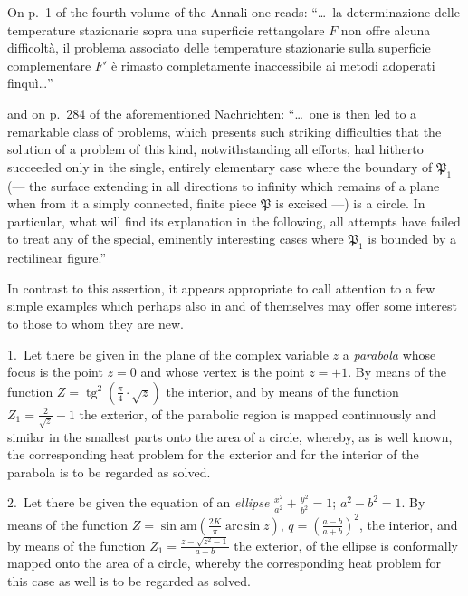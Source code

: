 \documentclass{article}
\begin{document}
On p.~1 of the fourth volume of the Annali one reads: ``\dots\ la determinazione delle temperature stazionarie sopra una superficie rettangolare $F$ non offre alcuna difficoltà, il problema associato delle temperature stazionarie sulla superficie complementare $F'$ è rimasto completamente inaccessibile ai metodi adoperati finquì\dots''

and on p.~284 of the aforementioned Nachrichten: ``\dots\ one is then led to a remarkable class of problems, which presents such striking difficulties that the solution of a problem of this kind, notwithstanding all efforts, had hitherto succeeded only in the single, entirely elementary case where the boundary of $\mathfrak{P}_1$ (--- the surface extending in all directions to infinity which remains of a plane when from it
a simply connected, finite piece $\mathfrak{P}$ is excised ---) is a circle. In particular, what will find its explanation in the following, all attempts have failed to treat any of the special, eminently interesting cases where $\mathfrak{P}_1$ is bounded by a rectilinear figure.''

In contrast to this assertion, it appears appropriate to call attention to a few simple examples which perhaps also in and of themselves may offer some interest to those to whom they are new.

1.~Let there be given in the plane of the complex variable $z$ a \emph{parabola} whose focus is the point $z = 0$ and whose vertex is the point $z = +1$. By means of the function $Z = \operatorname{tg}^2\!\left(\frac{\pi}{4} \cdot \sqrt{z}\right)$ the interior, and by means of the function $Z_1 = \frac{2}{\sqrt{z}} - 1$ the exterior, of the parabolic region is mapped continuously and similar in the smallest parts onto the area of a circle, whereby, as is well known, the corresponding heat problem for the exterior and for the interior of the parabola is to be regarded as solved.

2.~Let there be given the equation of an \emph{ellipse} $\frac{x^2}{a^2} + \frac{y^2}{b^2} = 1$; $a^2 - b^2 = 1$. By means of the function $Z = \sin\mathrm{am}\left(\frac{2K}{\pi} \operatorname{arc\,sin} z\right)$, $q = \left(\frac{a - b}{a + b}\right)^2$, the interior, and by means of the function $Z_1 = \frac{z - \sqrt{z^2 - 1}}{a - b}$ the exterior, of the ellipse is conformally mapped onto the area of a circle, whereby the corresponding heat problem for this case as well is to be regarded as solved.
\end{document}
